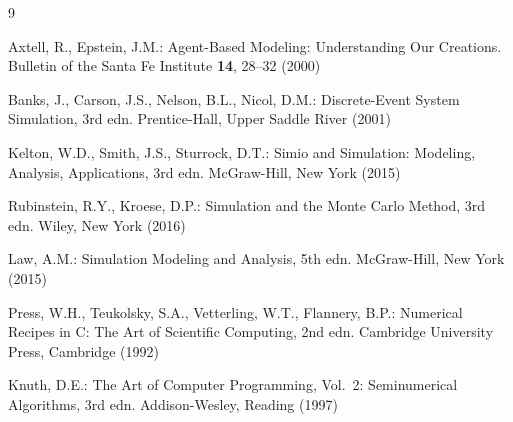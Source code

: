 \documentclass{llncs}
\begin{document}
\begin{thebibliography}{9}

Axtell, R., Epstein, J.M.: Agent-Based Modeling: Understanding Our Creations.
Bulletin of the Santa Fe Institute \textbf{14}, 28--32 (2000)

Banks, J., Carson, J.S., Nelson, B.L., Nicol, D.M.:
Discrete-Event System Simulation, 3rd edn.
Prentice-Hall, Upper Saddle River (2001)

Kelton, W.D., Smith, J.S., Sturrock, D.T.:
Simio and Simulation: Modeling, Analysis, Applications, 3rd edn.
McGraw-Hill, New York (2015)

Rubinstein, R.Y., Kroese, D.P.:
Simulation and the Monte Carlo Method, 3rd edn.
Wiley, New York (2016)

Law, A.M.:
Simulation Modeling and Analysis, 5th edn.
McGraw-Hill, New York (2015)

Press, W.H., Teukolsky, S.A., Vetterling, W.T., Flannery, B.P.:
Numerical Recipes in C: The Art of Scientific Computing, 2nd edn.
Cambridge University Press, Cambridge (1992)

Knuth, D.E.:
The Art of Computer Programming, Vol.~2: Seminumerical Algorithms, 3rd edn.
Addison-Wesley, Reading (1997)

\end{thebibliography}
\end{document}
